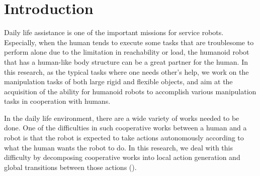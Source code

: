 \section{Introduction}
Daily life assistance is one of the important missions for service robots. Especially, when the human tends to execute some tasks that are troublesome to perform alone due to the limitation in reachability or load, the humanoid robot that has a human-like body structure can be a great partner for the human. %
In this research, as the typical tasks where one needs other's help, we work on the manipulation tasks of both large rigid and flexible objects, and aim at the acquisition of the ability for humanoid robots to accomplish various manipulation tasks in cooperation with humans.\par
In the daily life environment, there are a wide variety of works needed to be done.
One of the difficulties in such cooperative works between a human and a robot is that the robot is expected to take actions autonomously according to what the human wants the robot to do.
In this research, we deal with this difficulty by decomposing cooperative works into local action generation and global transitions between those actions ().





